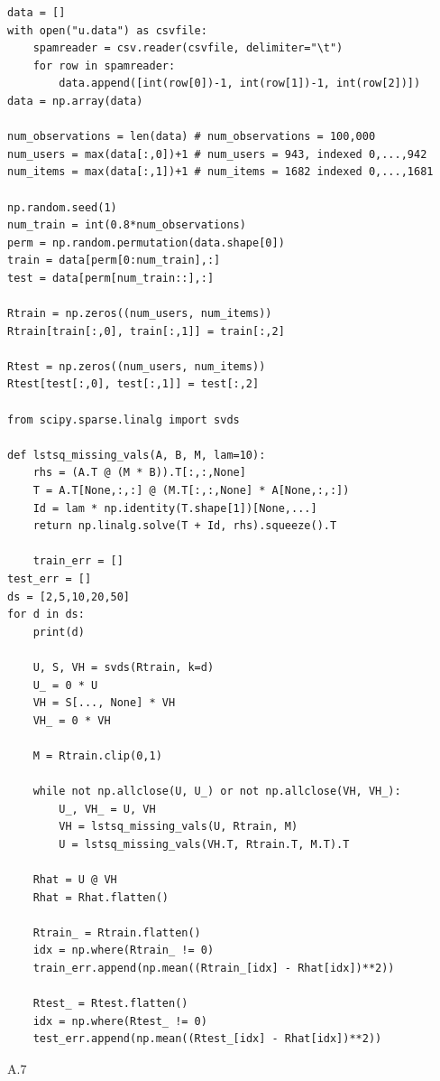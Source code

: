 \documentclass{article}
\begin{document}
\begin{enumerate}
\begin{verbatim}
data = []
with open("u.data") as csvfile:
    spamreader = csv.reader(csvfile, delimiter="\t")
    for row in spamreader:
        data.append([int(row[0])-1, int(row[1])-1, int(row[2])])
data = np.array(data)

num_observations = len(data) # num_observations = 100,000
num_users = max(data[:,0])+1 # num_users = 943, indexed 0,...,942
num_items = max(data[:,1])+1 # num_items = 1682 indexed 0,...,1681

np.random.seed(1)
num_train = int(0.8*num_observations)
perm = np.random.permutation(data.shape[0])
train = data[perm[0:num_train],:]
test = data[perm[num_train::],:]

Rtrain = np.zeros((num_users, num_items))
Rtrain[train[:,0], train[:,1]] = train[:,2]

Rtest = np.zeros((num_users, num_items))
Rtest[test[:,0], test[:,1]] = test[:,2]

from scipy.sparse.linalg import svds

def lstsq_missing_vals(A, B, M, lam=10):
    rhs = (A.T @ (M * B)).T[:,:,None]
    T = A.T[None,:,:] @ (M.T[:,:,None] * A[None,:,:])
    Id = lam * np.identity(T.shape[1])[None,...]
    return np.linalg.solve(T + Id, rhs).squeeze().T

    train_err = []
test_err = []
ds = [2,5,10,20,50]
for d in ds:
    print(d)
    
    U, S, VH = svds(Rtrain, k=d)
    U_ = 0 * U
    VH = S[..., None] * VH
    VH_ = 0 * VH

    M = Rtrain.clip(0,1)

    while not np.allclose(U, U_) or not np.allclose(VH, VH_):
        U_, VH_ = U, VH
        VH = lstsq_missing_vals(U, Rtrain, M)
        U = lstsq_missing_vals(VH.T, Rtrain.T, M.T).T
        
    Rhat = U @ VH
    Rhat = Rhat.flatten()

    Rtrain_ = Rtrain.flatten()
    idx = np.where(Rtrain_ != 0)
    train_err.append(np.mean((Rtrain_[idx] - Rhat[idx])**2))

    Rtest_ = Rtest.flatten()
    idx = np.where(Rtest_ != 0)
    test_err.append(np.mean((Rtest_[idx] - Rhat[idx])**2))    
        \end{verbatim}
\end{enumerate}

\newpage

A.7
\end{document}
